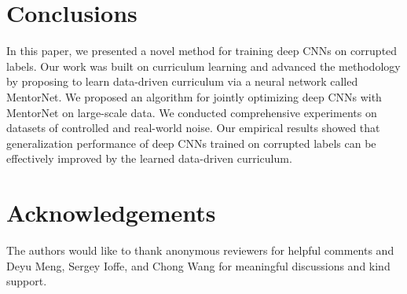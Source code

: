 \documentclass{article}
\begin{document}
\vspace{-2mm}
\section{Conclusions}
\vspace{-2mm}
In this paper, we presented a novel method for training deep CNNs on corrupted labels. Our work was built on curriculum learning and advanced the methodology by proposing to learn data-driven curriculum via a neural network called MentorNet. We proposed an algorithm for jointly optimizing deep CNNs with MentorNet on large-scale data. We conducted comprehensive experiments on datasets of controlled and real-world noise. Our empirical results showed that generalization performance of deep CNNs trained on corrupted labels can be effectively improved by the learned data-driven curriculum.


\section*{Acknowledgements}
The authors would like to thank anonymous reviewers for helpful comments and Deyu Meng, Sergey Ioffe, and Chong Wang for meaningful discussions and kind support.




\balance
\end{document}
